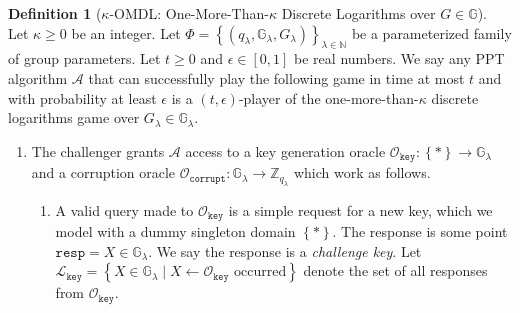 \documentclass[11pt]{article}
\theoremstyle{definition}
\newtheorem{definition}[definition]{Definition}
\newcommand{\G}{\mathbb{G}}
\newcommand{\bbn}{\mathbb{N}}
\newcommand{\secpar}{\lambda}
\newcommand{\corruptionOracle}{\mathcal{O}_{\texttt{corrupt}}}
\newcommand{\keyOracle}{\mathcal{O}_{\texttt{key}}}
\newcommand{\challengeKeySet}{\mathcal{L}_{\texttt{key}}}
\begin{document}
\begin{definition}[$\kappa$-OMDL: One-More-Than-$\kappa$ Discrete Logarithms over $G \in \G$]\label{def:omdl}
Let $\kappa \geq 0$ be an integer. Let $ \Phi = \left\{(q_\secpar, \G_\secpar, G_\secpar)\right\}_{\secpar \in \bbn}$ be a parameterized family of group parameters. Let $t \geq 0$ and $\epsilon \in [0, 1]$ be real numbers. We say any PPT algorithm $\mathcal{A}$ that can successfully play the following game in time at most $t$ and with probability at least $\epsilon$ is a $(t,\epsilon)$-player of the one-more-than-$\kappa$ discrete logarithms game over $G_\secpar \in \G_\secpar$.
\begin{enumerate}
\item The challenger grants $\mathcal{A}$ access to a key generation oracle $\keyOracle:\left\{\ast\right\} \to \G_\secpar$ and a corruption oracle $\corruptionOracle: \G_\secpar \to \mathbb{Z}_{q_\secpar}$ which work as follows.
\begin{enumerate}
\item A valid query made to $\keyOracle$ is a simple request for a new key, which we model with a dummy singleton domain $\left\{\ast\right\}$. The response is some point $\texttt{resp}=X \in \G_\secpar$. We say the response is a \textit{challenge key}. Let $\challengeKeySet = \left\{X \in \G_\secpar \mid X \leftarrow \keyOracle\text{ occurred}\right\}$ denote the set of all responses from $\keyOracle$.


\end{enumerate}
\end{enumerate}
\end{definition}
\end{document}
